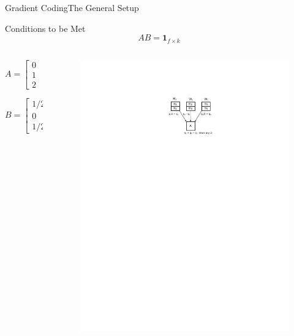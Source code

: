 \documentclass{beamer}
\begin{document}
\begin{frame}{Gradient Coding}{The General Setup}

\begin{block}{Conditions to be Met}
    \[AB = \boldsymbol{1}_{f\times k}\]
\end{block}

\begin{columns}

\begin{column}{.5\linewidth}
        
\begin{Example}
    \[A = \begin{bmatrix}
        0 & 1 & 2 \\
        1 & 0 & 1 \\
        2 & -1 & 0
    \end{bmatrix}\]
    
    \[B = \begin{bmatrix}
        1/2 & 1 & 0 \\
        0 & 1 & -1 \\
        1/2 & 0 & 1
    \end{bmatrix}\]
\end{Example}
    
\end{column}

\begin{column}{.5\linewidth}

\begin{figure}
    \centering
    \includegraphics[width=\textwidth]{res/gradient coding.pdf}
\end{figure}


\end{column}
\end{columns}
\end{frame}
\end{document}
